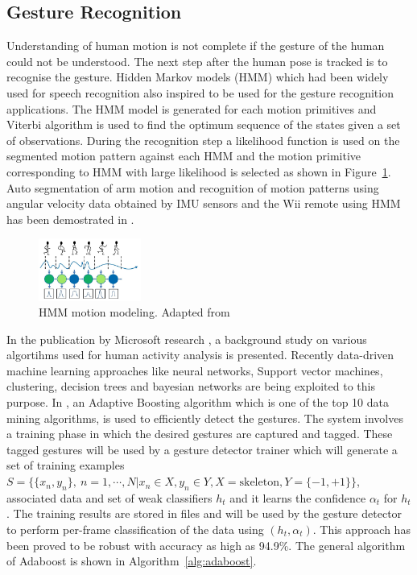 \subsection{Gesture Recognition}
	Understanding of human motion is not complete if the gesture of the human could not be understood. The next step after the human pose is tracked is to recognise the gesture. Hidden Markov models (HMM) which had been widely used for speech recognition\cite{rabiner1989tutorial} also inspired to be used for the gesture recognition applications. The HMM model is generated for each motion primitives and Viterbi algorithm is used to find the optimum sequence of the states given a set of observations. During the recognition step a likelihood function is used on the segmented motion pattern against each HMM and the motion primitive corresponding to HMM with large likelihood is selected as shown in Figure~\ref{fig:hmm}. Auto segmentation of arm motion and recognition of motion patterns using angular velocity data obtained by IMU sensors and the Wii remote using HMM has been demostrated in \cite{aoki2013segmentation}. 
\begin{figure}[H]
\centering
\includegraphics[width=0.3\textwidth]{assets/HMM.png}
\caption[HMM motion modeling]{HMM motion modeling. {Adapted from \cite{aoki2013segmentation}}}
\label{fig:hmm}
\end{figure}
	In the publication by Microsoft research \cite{han2013enhanced}, a background study on various algortihms used for human activity analysis is presented. Recently \cite{KinectSDK2014} data-driven machine learning approaches like neural networks, Support vector machines, clustering, decision trees and bayesian networks are being exploited to this purpose. In \cite{KinectSDK2014}, an Adaptive Boosting algorithm\cite{freund1997decision} which is one of the top 10 data mining algorithms, is used to efficiently detect the gestures. The system involves a training phase in which the desired gestures are captured and tagged. These tagged gestures will be used by a gesture detector trainer which will generate a set of training examples $S=\lbrace \lbrace x_n,y_n \rbrace,\ n=1,\cdots,N \vert x_n\in X,y_n\in Y, X=\text{skeleton},Y=\lbrace -1,+1 \rbrace\rbrace$, associated data and set of weak classifiers $h_t$ and it learns the confidence $\alpha_t$ for $h_t$. The training results are stored in files and will be used by the gesture detector to perform per-frame classification of the data using $(h_t,\alpha_t)$. This approach has been proved to be robust with accuracy as high as 94.9\%. The general algorithm of Adaboost is shown in Algorithm~\ref{alg:adaboost}. \\
